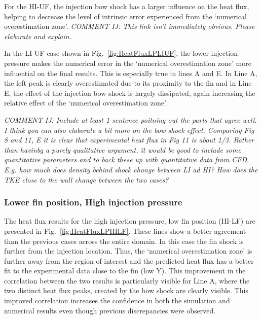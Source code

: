 \documentclass{AIAA}
\begin{document}
For the HI-UF, the injection bow shock has a larger influence on the heat flux, helping to decrease the level of intrinsic error experienced from the `numerical overestimation zone'.
{\it COMMENT IJ: This link isn't immediately obvious. Please elaborate and explain.}

In the LI-UF case shown in Fig.~\ref{fig:HeatFluxLPLIUF}, the lower injection pressure makes the numerical error in the `numerical overestimation zone' more influential on the final results.
This is especially true in lines A and E.
In Line A, the left peak is clearly overestimated due to its proximity to the fin and in Line E, the effect of the injection bow shock is largely dissipated, again increasing the relative effect of the `numerical overestimation zone'.

{\it COMMENT IJ: Include at least 1 sentence poitning out the parts  that agree well. I think you can also elaborate a bit more on the bow shock effect. Comparing Fig 8 and 11, E it is clear that experimental heat flux in Fig 11 is about 1/3. Rather than havinbg a purely qualitative argument, it would be good to include some quantitative parameters and to back these up with quantitative data from CFD. E.g. how much does density behind shock change between LI ad HI? How does the TKE close to the wall change between the two cases?}


\subsubsection{Lower fin position, High injection pressure}

The heat flux results for the high injection pressure, low fin position (HI-LF) are presented in Fig.~\ref{fig:HeatFluxLPHILF}.
These lines show a better agreement than the previous cases across the entire domain.
In this case the fin shock is further from the injection location. 
Thus, the `numerical overestimation zone' is further away from the region of interest and the predicted heat flux has a better fit to the experimental data close to the fin (low Y). 
This improvement in the correlation between the two results is particularly visible for Line A, where the two distinct heat flux peaks, created by the bow shock are clearly visible.
This improved correlation increases the confidence in both the simulation and numerical results even though previous discrepancies were observed. 
\end{document}
